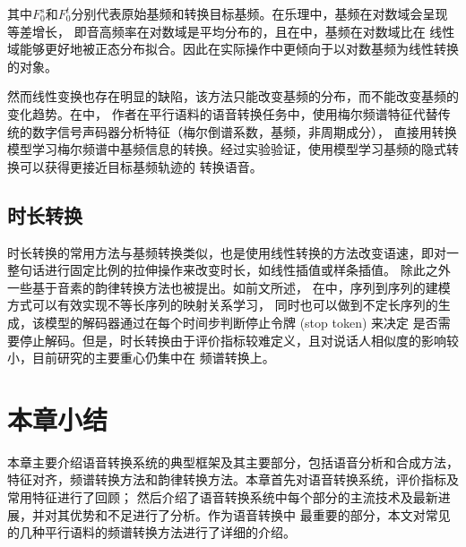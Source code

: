 其中$F_0^s$和$F_0^t$分别代表原始基频和转换目标基频。在乐理中，基频在对数域会呈现等差增长，
即音高频率在对数域是平均分布的，且在\cite{erro2009voice}中，基频在对数域比在
线性域能够更好地被正态分布拟合。因此在实际操作中更倾向于以对数基频为线性转换的对象。

然而线性变换也存在明显的缺陷，该方法只能改变基频的分布，而不能改变基频的变化趋势。在\cite{chen2018high}中，
作者在平行语料的语音转换任务中，使用梅尔频谱特征代替传统的数字信号声码器分析特征（梅尔倒谱系数，基频，非周期成分），
直接用转换模型学习梅尔频谱中基频信息的转换。经过实验验证，使用模型学习基频的隐式转换可以获得更接近目标基频轨迹的
转换语音。

\subsection{时长转换}
时长转换的常用方法与基频转换类似，也是使用线性转换的方法改变语速，即对一整句话进行固定比例的拉伸操作来改变时长，如线性插值或样条插值。
除此之外一些基于音素的韵律转换方法也被提出\cite{helander2007novel}。如前文所述，
在\cite{tanaka2019atts2s}中，序列到序列的建模方式可以有效实现不等长序列的映射关系学习，
同时也可以做到不定长序列的生成，该模型的解码器通过在每个时间步判断停止令牌 (stop token) 来决定
是否需要停止解码。但是，时长转换由于评价指标较难定义，且对说话人相似度的影响较小，目前研究的主要重心仍集中在
频谱转换上。

\section{本章小结}
本章主要介绍语音转换系统的典型框架及其主要部分，包括语音分析和合成方法，
特征对齐，频谱转换方法和韵律转换方法。本章首先对语音转换系统，评价指标及常用特征进行了回顾；
然后介绍了语音转换系统中每个部分的主流技术及最新进展，并对其优势和不足进行了分析。作为语音转换中
最重要的部分，本文对常见的几种平行语料的频谱转换方法进行了详细的介绍。